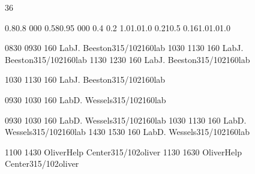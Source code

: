 \documentclass[10pt]{report}
\begin{document}
\thispagestyle{empty}
\begin{landscape}
\noindent{}

\setslotsize{4cm}{0.42cm}
 {36}
\settextframe{3mm}

\settimestyle{\small}

 {0.8}{0.8} {0}{0}{0}
 {0.58}{0.95} {0}{0}{0}
 {0.4} {0.2} {1.0}{1.0}{1.0}
 {0.21}{0.5} {0.16}{1.0}{1.0}{1.0}

\begin{timetable}


   {0830} {0930} {160 Lab}{J. Beeston}{315/102}{160lab}
   {1030} {1130} {160 Lab}{J. Beeston}{315/102}{160lab}
   {1130} {1230} {160 Lab}{J. Beeston}{315/102}{160lab}

   {1030} {1130} {160 Lab}{J. Beeston}{315/102}{160lab}

   {0930} {1030} {160 Lab}{D. Wessels}{315/102}{160lab}

   {0930} {1030} {160 Lab}{D. Wessels}{315/102}{160lab}
   {1030} {1130} {160 Lab}{D. Wessels}{315/102}{160lab}
   {1430} {1530} {160 Lab}{D. Wessels}{315/102}{160lab}


   {1100} {1430} {Oliver}{Help Center}{315/102}{oliver}
   {1130} {1630} {Oliver}{Help Center}{315/102}{oliver}

\end{timetable}
\end{landscape}
\end{document}
